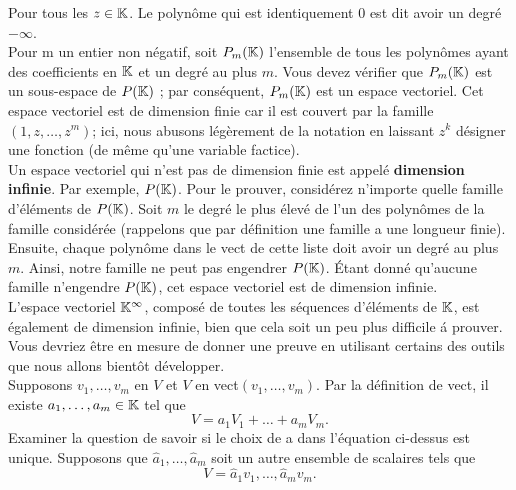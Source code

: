 \documentclass[12pt]{book}
\begin{document}
\pagebreak
\newpage
Pour tous les $z \in \mathbb{K}$. Le polynôme qui est identiquement $0$ est dit avoir un degr\'e $-\infty$.\\
\indent
Pour m un entier non n\'egatif, soit $P_m(\mathbb{K})$ l’ensemble de tous les polyn\^omes ayant des coefficients en $\mathbb{K}$ et un degr\'e au plus $m$. Vous devez v\'erifier que $P_m(\mathbb{K})$ est un sous-espace de $P(\mathbb{K})$ ; par cons\'equent, $P_m(\mathbb{K})$ est un espace vectoriel. Cet espace vectoriel est de dimension finie car il est couvert par la famille $(1,z,\ldots,z^m)$; ici, nous abusons l\'eg\`erement de la notation en laissant $z^k$ désigner une fonction (de même qu’une variable factice).\\
\indent
Un espace vectoriel qui n’est pas de dimension finie est appel\'e \textbf{dimension infinie}. Par exemple, $P(\mathbb{K})$. Pour le prouver, consid\'erez n’importe quelle famille d’\'el\'ements de $P(\mathbb{K})$. Soit $m$ le degr\'e le plus \'elev\'e de l’un des polyn\^omes de la famille consid\'er\'ee (rappelons que par d\'efinition une famille a une longueur finie). Ensuite, chaque polyn\^ome dans le vect de cette liste doit avoir un degr\'e au plus $m$. Ainsi, notre famille ne peut pas engendrer $P(\mathbb{K})$.  \'Etant donn\'e qu’aucune famille n'engendre $P(\mathbb{K})$, cet espace vectoriel est de dimension infinie.\\
\indent
L’espace vectoriel $\mathbb{K}^\infty$, compos\'e de toutes les s\'equences d’\'el\'ements de $\mathbb{K}$, est \'egalement de dimension infinie, bien que cela soit un peu plus difficile \'a prouver. Vous devriez \^etre en mesure de donner une preuve en utilisant certains des outils que nous allons bient\^ot d\'evelopper.\\
\indent
Supposons $v_1,\ldots,v_m$ en $V$ et $V$ en vect$(v_1,\ldots,v_m)$. Par la d\'efinition de vect, il existe $a_1,\ldots,a_m \in \mathbb{K}$ tel que
\begin{equation*}
V = a_1V_1+\ldots+a_mV_m.
\end{equation*}
Examiner la question de savoir si le choix de a dans l’\'equation ci-dessus est unique. Supposons que $\hat{a}_1,\ldots,\hat{a}_m$ soit un autre ensemble de scalaires tels que
\begin{equation*}
    V = \hat{a}_1v_1,\ldots,\hat{a}_mv_m.
\end{equation*}
\end{document}
